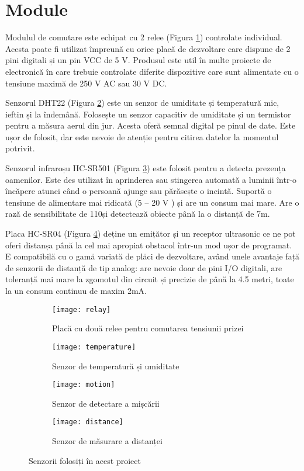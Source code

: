 \break

\section{Module} 

Modulul de comutare este echipat cu 2 relee (Figura \ref{fig:relay}) controlate individual. Acesta poate fi utilizat împreună cu orice placă de dezvoltare care dispune de 2 pini digitali și un pin VCC de 5 V. Produsul este util în multe proiecte de electronică în care trebuie controlate diferite dispozitive care sunt alimentate cu o tensiune maximă de 250 V AC sau 30 V DC.

Senzorul DHT22 (Figura \ref{fig:temperature}) este un senzor de umiditate și temperatură mic, ieftin și la îndemână. Folosește un senzor capacitiv de umiditate și un termistor pentru a măsura aerul din jur. Acesta oferă semnal digital pe pinul de date. Este ușor de folosit, dar este nevoie de atenție pentru citirea datelor la momentul potrivit.

Senzorul infraroșu HC-SR501 (Figura \ref{fig:motion}) este folosit pentru a detecta prezența oamenilor. Este des utilizat în aprinderea sau stingerea automată a luminii într-o încăpere atunci când o persoană ajunge sau părăsește o incintă. Suportă o tensiune de alimentare mai ridicată (5 – 20 V ) și are un consum mai mare. Are o rază de sensibilitate de 110\textdegree și detectează obiecte până la o distanță de 7m.

Placa HC-SR04 (Figura \ref{fig:distance}) deține un emițător și un receptor ultrasonic ce ne pot oferi distanșa până la cel mai apropiat obstacol într-un mod ușor de programat. E compatibilă cu o gamă variată de plăci de dezvoltare, având unele avantaje față de senzorii de distanță de tip analog: are nevoie doar de pini I/O digitali, are toleranță mai mare la zgomotul din circuit și precizie de până la 4.5 metri, toate la un consum continuu de maxim 2mA.

\begin{figure}[h]
	\centering
	\begin{subfigure}{0.3\textwidth}
		\centering
		\texttt{[image: relay]}
		\caption{Placă cu două relee pentru comutarea tensiunii prizei}
		\label{fig:relay}
	\end{subfigure}
	\hfill
	\begin{subfigure}{0.3\textwidth}
		\centering
		\texttt{[image: temperature]}
		\caption{Senzor de temperatură și umiditate}
		\label{fig:temperature}
	\end{subfigure}
	
	\begin{subfigure}{0.3\textwidth}
		\centering
		\texttt{[image: motion]}
		\caption{Senzor de detectare a mișcării}
		\label{fig:motion}
	\end{subfigure}
	\hfill
	\begin{subfigure}{0.3\textwidth}
		\centering
		\texttt{[image: distance]}
		\caption{Senzor de măsurare a distanței}
		\label{fig:distance}
	\end{subfigure}
	
	\caption{Senzorii folosiți în acest proiect}
	\label{fig:all}
\end{figure}
